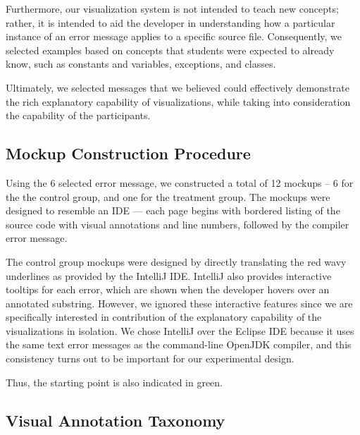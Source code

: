 \documentclass[conference]{IEEEtran}
\begin{document}
Furthermore, our visualization system is not intended to teach new concepts; rather, it is intended to aid the developer in understanding how a particular instance of an error message applies to a specific source file. Consequently, we selected examples based on concepts that students were expected to already know, such as constants and variables, exceptions, and classes.


Ultimately, we selected messages that we believed could effectively demonstrate the rich explanatory capability of visualizations, while taking into consideration the capability of the participants. 

\subsection{Mockup Construction Procedure}

Using the 6 selected error message, we constructed a total of 12 mockups -- 6 for the the control group, and one for the treatment group.  The mockups were designed to resemble an IDE --- each page begins with bordered listing of the source code with visual annotations and line numbers, followed by the compiler error message.

The control group mockups were designed by directly translating the red wavy underlines as provided by the IntelliJ IDE. IntelliJ also provides interactive tooltips for each error, which are shown when the developer hovers over an annotated substring. However, we ignored these interactive features since we are specifically interested in contribution of the explanatory capability of the visualizations in isolation. We chose IntelliJ over the Eclipse IDE because it uses the same text error messages as the command-line OpenJDK compiler, and this consistency turns out to be important for our experimental design.

Thus, the starting point is also indicated in green.

\subsection{Visual Annotation Taxonomy}
\end{document}
